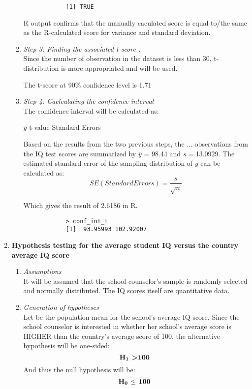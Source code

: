 \documentclass[12pt,letterpaper]{article}
\begin{document}
\begin{enumerate}
\begin{enumerate}
			
		\begin{verbatim}
			[1] TRUE
		\end{verbatim}
		R output confirms that the manually caculated score is equal to/the same as the R-calculated score for variance and standard deviation.
		\item \textit{Step 3: Finding the associated t-score :}\\
		Since the number of observation in the dataset is less than 30, t-distribution is more appropriated and will be used.
			
		The t-score at 90\% confidence level is 1.71
		\item \textit{Step 4: Caclculating the confidence interval}\\
		The confidence interval will be calculated as:
		\begin{center}
		$\bar{y}$ {\textpm} t-value \texttimes Standard Errors
		\end{center}
		Based on the results from the two previous steps, the ... observations from the IQ test scores are summarized by $\bar{y}$ = 98.44 and \textit{s} = 13.0929. The estimated standard error of the sampling distribution of $\bar{y}$ can be calculated as: 
			$${SE(Standard Errors) = \frac{\textit{s}}{\sqrt{n}}}$$
			
		Which gives the result of 2.6186 in R.
			
		\begin{verbatim}
			> conf_int_t
			[1]  93.95993 102.92007
		\end{verbatim}
	\end{enumerate} 
	\item \textbf{Hypothesis testing for the average student IQ versus the country average IQ score}
	\begin{enumerate}
		\item \textit{Assumptions} \\
		It will be assumed that the school counselor's sample is randomly selected and normally distributed. The IQ scores itself are quantitative data.
		
		\item \textit{Generation of hypotheses}\\
		Let {\textmu} be the population mean for the school's average IQ score. Since the school counselor is interested in whether her school's average score is HIGHER than the country's average score of 100, the alternative hypothesis will be one-sided:
 				$${\textbf{H\textsubscript{1} \textgreater 100 }}$$
 		And thus the null hypothesis will be:
 				$${\textbf{H\textsubscript{0} $\le$ 100 }}$$
 				

\end{enumerate}
\end{enumerate}
\end{document}
